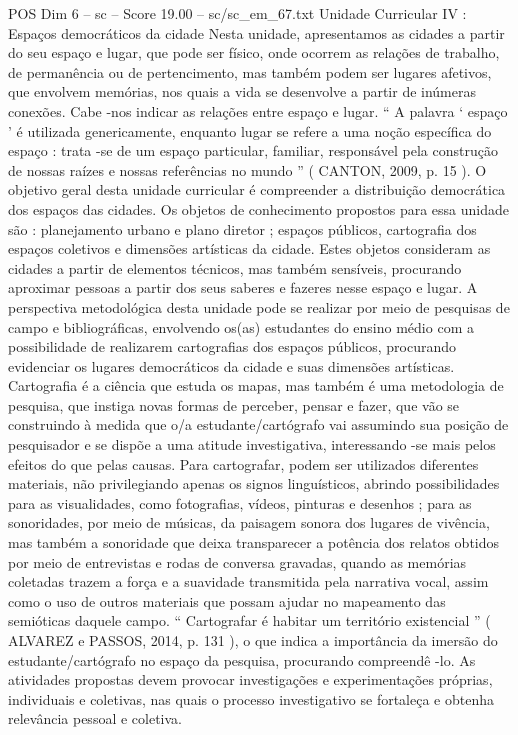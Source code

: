 \begin{textsample}{POS Dim 6 – sc – Score 19.00 – sc/sc\_em\_67.txt}
Unidade Curricular IV : Espaços democráticos da cidade Nesta unidade, apresentamos as cidades a partir do seu espaço e lugar, que pode ser físico, onde ocorrem as relações de trabalho, de permanência ou de pertencimento, mas também podem ser lugares afetivos, que envolvem memórias, nos quais a vida se desenvolve a partir de inúmeras conexões.
Cabe -nos indicar as relações entre espaço e lugar. “ A palavra ‘ espaço ’ é utilizada genericamente, enquanto lugar se refere a uma noção específica do espaço : trata -se de um espaço particular, familiar, responsável pela construção de nossas raízes e nossas referências no mundo ” ( CANTON, 2009, p. 15 ).
O objetivo geral desta unidade curricular é compreender a distribuição democrática dos espaços das cidades.
Os objetos de conhecimento propostos para essa unidade são : planejamento urbano e plano diretor ; espaços públicos, cartografia dos espaços coletivos e dimensões artísticas da cidade.
Estes objetos consideram as cidades a partir de elementos técnicos, mas também sensíveis, procurando aproximar pessoas a partir dos seus saberes e fazeres nesse espaço e lugar.
A perspectiva metodológica desta unidade pode se realizar por meio de pesquisas de campo e bibliográficas, envolvendo os(as) estudantes do ensino médio com a possibilidade de realizarem cartografias dos espaços públicos, procurando evidenciar os lugares democráticos da cidade e suas dimensões artísticas.
Cartografia é a ciência que estuda os mapas, mas também é uma metodologia de pesquisa, que instiga novas formas de perceber, pensar e fazer, que vão se construindo à medida que o/a estudante/cartógrafo vai assumindo sua posição de pesquisador e se dispõe a uma atitude investigativa, interessando -se mais pelos efeitos do que pelas causas.
Para cartografar, podem ser utilizados diferentes materiais, não privilegiando apenas os signos linguísticos, abrindo possibilidades para as visualidades, como fotografias, vídeos, pinturas e desenhos ; para as sonoridades, por meio de músicas, da paisagem sonora dos lugares de vivência, mas também a sonoridade que deixa transparecer a potência dos relatos obtidos por meio de entrevistas e rodas de conversa gravadas, quando as memórias coletadas trazem a força e a suavidade transmitida pela narrativa vocal, assim como o uso de outros materiais que possam ajudar no mapeamento das semióticas daquele campo. “ Cartografar é habitar um território existencial ” ( ALVAREZ e PASSOS, 2014, p. 131 ), o que indica a importância da imersão do estudante/cartógrafo no espaço da pesquisa, procurando compreendê -lo.
As atividades propostas devem provocar investigações e experimentações próprias, individuais e coletivas, nas quais o processo investigativo se fortaleça e obtenha relevância pessoal e coletiva.

\end{textsample}
